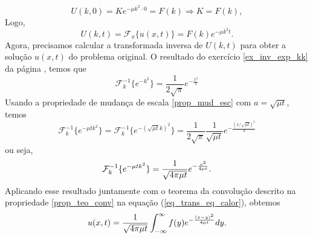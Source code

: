 $$
U(k,0)=Ke^{-\mu k^2 \cdot 0 }=F(k)\Rightarrow K=F(k),
$$
Logo,
\begin{equation}\label{eq_trans_eq_calor}
U(k,t) =\mathcal{F}_x\{u(x,t)\}=F(k)e^{-\mu k^2 t}.
\end{equation}
Agora, precisamos calcular a transformada inversa de $U(k,t)$ para obter a solução $u(x,t)$ do problema original. O resultado do exercício \ref{ex_inv_exp_kk} da página \pageref{ex_inv_exp_kk}, temos que
$$
\mathcal{F}^{-1}_k\{e^{-k^2}\}=\frac{1}{2\sqrt{\pi}} e^{-\frac{x^2}{4}}
$$
Usando a propriedade de mudança de escala \ref{prop_mud_esc} com $a=\sqrt{\mu t}$, temos
$$
\mathcal{F}_k^{-1}\{e^{-\mu t k^2}\}=\mathcal{F}_k^{-1}\{e^{-(\sqrt{\mu t} k)^2}\}=\frac{1}{2\sqrt{\pi}}\frac{1}{\sqrt{\mu t}} e^{-\frac{\left(x/\sqrt{\mu t}\right)^2}{4}}
$$
ou seja,
\begin{equation}{\label{eq_calor_02}}
\mathcal{F}_k^{-1}\{e^{-\mu t k^2}\}=\frac{1}{\sqrt{4\pi\mu t}} e^{-\frac{x^2}{4\mu t}}.
\end{equation}
Aplicando esse resultado juntamente com o teorema da convolução descrito na propriedade \ref{prop_teo_conv} na equação (\ref{eq_trans_eq_calor}), obtemos
\begin{equation}{\label{eq_dif_calor}}
u(x,t)=\frac{1}{\sqrt{4\pi \mu t}}\int_{-\infty}^\infty
f(y)e^{-\frac{(x-y)^2}{4\mu t}}dy.
\end{equation}


